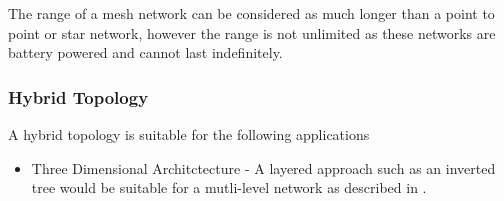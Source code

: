The range of a mesh network can be considered as much longer than a point to
point or star network, however the range is not unlimited as these networks
are battery powered and cannot last indefinitely.

\subsubsection{Hybrid Topology}
A hybrid topology is suitable for the following applications
\begin{itemize}
\item{Three Dimensional Architctecture - A layered approach such as an inverted tree would be
suitable for a mutli-level network as described in
\cite{tier_based_underwater_routing}.}
\end{itemize}
